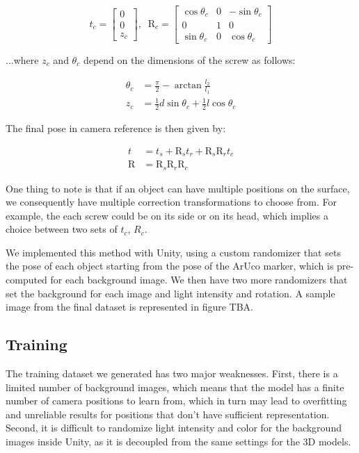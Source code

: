 \begin{equation*}
    t_c = 
    \begin{bmatrix}
        0\\0\\z_c
    \end{bmatrix}
    ,\; \; \text{R}_c =
    \begin{bmatrix}
        \cos \theta_c & 0 & -\sin \theta_c\\
        0 & 1 & 0\\
        \sin \theta_c & 0 &  \cos \theta_c
    \end{bmatrix}
\end{equation*}

...where $z_c$ and $\theta_c$ depend on the dimensions of the screw as follows:

\begin{align*}
    \theta_c &= \frac{\pi}{2} - \arctan \frac{l_2}{l_1}\\
    z_c &= \frac{1}{2}d \sin \theta_c + \frac{1}{2} l \cos \theta_c
\end{align*}

The final pose in camera reference is then given by:

\begin{align*}
    t &= t_s + \text{R}_s t_r + \text{R}_s \text{R}_r t_c\\
    \text{R} &= \text{R}_s \text{R}_r \text{R}_c
\end{align*}

One thing to note is that if an object can have multiple positions on the surface, we consequently have multiple correction transformations to choose from. For example, the each screw could be on its side or on its head, which implies a choice between two sets of $t_c$, $R_c$.

We implemented this method with Unity, using a custom randomizer that sets the pose of each object starting from the pose of the ArUco marker, which is pre-computed for each background image. We then have two more randomizers that set the background for each image and light intensity and rotation. A sample image from the final dataset is represented in figure TBA.

\subsection{Training}

The training dataset we generated has two major weaknesses. First, there is a limited number of background images, which means that the model has a finite number of camera positions to learn from, which in turn may lead to overfitting and unreliable results for positions that don't have sufficient representation. Second, it is difficult to randomize light intensity and color for the background images inside Unity, as it is decoupled from the same settings for the 3D models.

